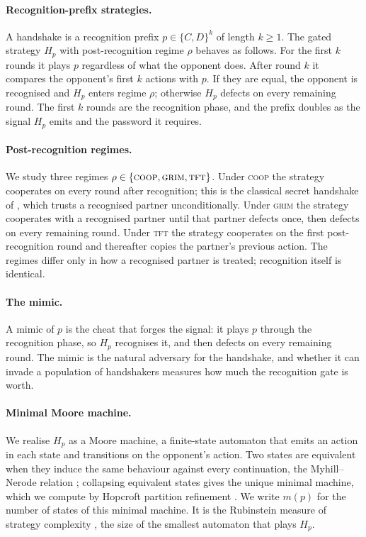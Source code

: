 \paragraph{Recognition-prefix strategies.}
A handshake is a recognition prefix $p\in\{C,D\}^k$ of length $k\ge 1$. The gated
strategy $H_p$ with post-recognition regime $\rho$ behaves as follows. For the
first $k$ rounds it plays $p$ regardless of what the opponent does. After round
$k$ it compares the opponent's first $k$ actions with $p$. If they are equal, the
opponent is recognised and $H_p$ enters regime $\rho$; otherwise $H_p$ defects on
every remaining round. The first $k$ rounds are the recognition phase, and the
prefix doubles as the signal $H_p$ emits and the password it requires.

\paragraph{Post-recognition regimes.}
We study three regimes $\rho\in\{\textsc{coop},\textsc{grim},\textsc{tft}\}$.
Under \textsc{coop} the strategy cooperates on every round after recognition; this
is the classical secret handshake of \citet{robson1990}, which trusts a
recognised partner unconditionally. Under \textsc{grim} the strategy cooperates
with a recognised partner until that partner defects once, then defects on every
remaining round. Under \textsc{tft} the strategy cooperates on the first post-
recognition round and thereafter copies the partner's previous action. The
regimes differ only in how a recognised partner is treated; recognition itself is
identical.

\paragraph{The mimic.}
A mimic of $p$ is the cheat that forges the signal: it plays $p$ through the
recognition phase, so $H_p$ recognises it, and then defects on every remaining
round. The mimic is the natural adversary for the handshake, and whether it can
invade a population of handshakers measures how much the recognition gate is
worth.

\paragraph{Minimal Moore machine.}
We realise $H_p$ as a Moore machine, a finite-state automaton that emits an
action in each state and transitions on the opponent's action. Two states are
equivalent when they induce the same behaviour against every continuation, the
Myhill--Nerode relation \citep{nerode1958}; collapsing equivalent states gives
the unique minimal machine, which we compute by Hopcroft partition refinement
\citep{hopcroft1971}. We write $m(p)$ for the number of states of this minimal
machine. It is the Rubinstein measure of strategy complexity
\citep{rubinstein1986}, the size of the smallest automaton that plays $H_p$.

